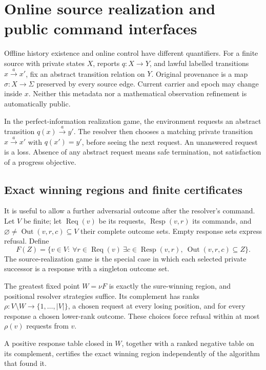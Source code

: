 \section{Online source realization and public command interfaces}
\label{online-realization}

Offline history existence and online control have different quantifiers.
For a finite source with private states $X$, reports $q:X\to Y$, and lawful
labelled transitions $x\xrightarrow a x'$, fix an abstract transition relation
on $Y$. Original provenance is a map $\sigma:X\to\Sigma$ preserved by every
source edge. Current carrier and epoch may change inside $x$. Neither this
metadata nor a mathematical observation refinement is automatically public.

In the perfect-information realization game, the environment requests an
abstract transition $q(x)\xrightarrow a y'$. The resolver then chooses a
matching private transition $x\xrightarrow a x'$ with $q(x')=y'$, before seeing
the next request. An unanswered request is a loss. Absence of any abstract
request means safe termination, not satisfaction of a progress objective.

\subsection{Exact winning regions and finite certificates}
\label{online-certificates}

It is useful to allow a further adversarial outcome after the resolver's
command. Let $V$ be finite; let $\operatorname{Req}(v)$ be its requests,
$\operatorname{Resp}(v,r)$ its commands, and
$\varnothing\ne\operatorname{Out}(v,r,c)\subseteq V$ their complete outcome
sets. Empty response sets express refusal. Define
\[
 F(Z)=\{v\in V:\ \forall r\in\operatorname{Req}(v)\ \exists c\in
 \operatorname{Resp}(v,r),\ \operatorname{Out}(v,r,c)\subseteq Z\}.
\]
The source-realization game is the special case in which each selected private
successor is a response with a singleton outcome set.

\begin{theorem}
\label{online-safety}
The greatest fixed point $W=\nu F$ is exactly the sure-winning region, and
positional resolver strategies suffice. Its complement has ranks
$\rho:V\setminus W\to\{1,\ldots,|V|\}$, a chosen request at every losing
position, and for every response a chosen lower-rank outcome. These choices
force refusal within at most $\rho(v)$ requests from $v$.

A positive response table closed in $W$, together with a ranked negative table
on its complement, certifies the exact winning region independently of the
algorithm that found it.
\end{theorem}

